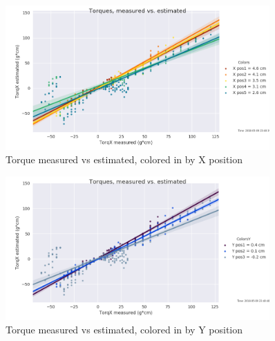 \documentclass[preprint,12pt,3p]{elsarticle}
\begin{document}
\begin{figure}[H]
\centering
            \includegraphics[width=0.9\textwidth]{images/round1/TorqX_Colors_X.png}%
            \caption{Torque measured vs estimated, colored in by X position}
\label{fig:x}
\end{figure}

\begin{figure}[H]
\centering
            \includegraphics[width=0.9\textwidth]{images/round1/TorqX_Colors_Y.png}%
\caption{Torque measured vs estimated, colored in by Y position}
\label{fig:y}
\end{figure}
\end{document}
